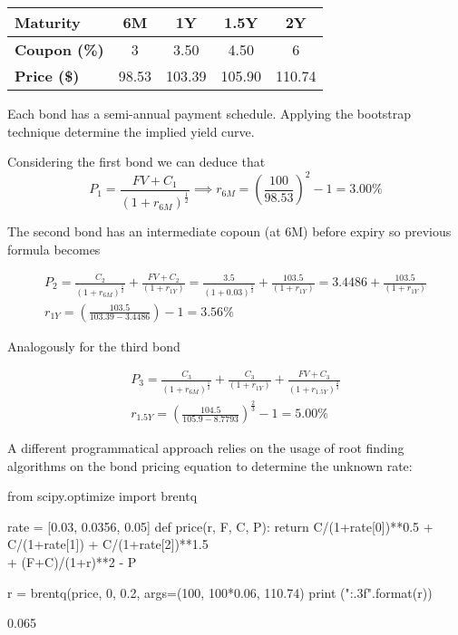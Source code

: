 \documentclass[12pt,a4paper]{exam}
\begin{document}
\begin{table}[h]
  \begin{center}
    \begin{tabular}{|l|c|c|c|c|}
      \hline
      \textbf{Maturity}    & 6M    & 1Y     & 1.5Y   & 2Y  \\ \hline
      \textbf{Coupon (\%)} & 3     & 3.50   & 4.50   & 6 \\ \hline
      \textbf{Price (\$)}  & 98.53 & 103.39 & 105.90 & 110.74 \\ \hline
    \end{tabular}
    \end{center}
  \end{table}
Each bond has a semi-annual payment schedule. Applying the bootstrap technique determine the implied yield curve.
\fillwithlines{3cm}
\begin{solution}
Considering the first bond we can deduce that
\begin{equation*}
  P_1 = \frac{FV + C_1}{(1+r_{6M})^{\frac{1}{2}}} \implies r_{6M} = \left(\frac{100}{98.53}\right)^{2} -1 = 3.00\%
\end{equation*}

The second bond has an intermediate copoun (at 6M) before expiry so previous formula becomes

\begin{equation*}
  \begin{gathered}
    P_2 =  \frac{C_2}{(1+r_{6M})^{\frac{1}{2}}} + \frac{FV + C_2}{(1+r_{1Y})} = \frac{3.5}{(1+0.03)^{\frac{1}{2}}} + \frac{103.5}{(1+r_{1Y})} = 3.4486 + \frac{103.5}{(1+r_{1Y})}\\
    r_{1Y} = \left(\frac{103.5}{103.39-3.4486}\right)-1 = 3.56\%
  \end{gathered}
\end{equation*}

Analogously for the third bond

\begin{equation*}
  \begin{gathered}
    P_3 =  \frac{C_3}{(1+r_{6M})^{\frac{1}{2}}} + \frac{C_3}{(1+r_{1Y})} +  \frac{FV+C_3}{(1+r_{1.5Y})^{\frac{2}{3}}} \\
    r_{1.5Y} = \left(\frac{104.5}{105.9-8.7793}\right)^{\frac{2}{3}}-1 = 5.00\%
  \end{gathered}
\end{equation*}

A different programmatical approach relies on the usage of root finding algorithms on the bond pricing equation to determine the unknown rate:
\begin{ipython}
from scipy.optimize import brentq

rate = [0.03, 0.0356, 0.05]
def price(r, F, C, P):
    return C/(1+rate[0])**0.5 + C/(1+rate[1]) + C/(1+rate[2])**1.5 \\
        + (F+C)/(1+r)**2 - P

r = brentq(price, 0, 0.2, args=(100, 100*0.06, 110.74)
print ("{:.3f}".format(r))
\end{ipython}
\begin{ioutput}
0.065
\end{ioutput}
\end{solution}
\end{document}
